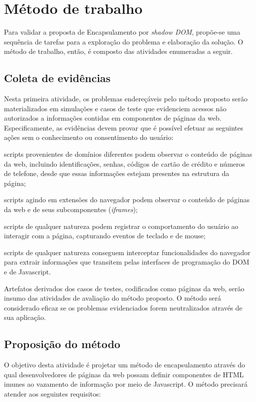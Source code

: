 \section{Método de trabalho}


Para validar a proposta de Encapsulamento por \textit{shadow DOM}, propõe-se uma sequência de tarefas para a exploração do problema e elaboração da solução. O método de trabalho, então, é composto das atividades enumeradas a seguir.


\subsection{Coleta de evidências}
Nesta primeira atividade, os problemas endereçáveis pelo método proposto serão materializados em simulações e casos de teste que evidenciem acessos não autorizados a informações contidas em componentes de páginas da web. Especificamente, as evidências devem provar que é possível efetuar as seguintes ações sem o conhecimento ou consentimento do usuário:

\begin{alineas}
	\item scripts provenientes de domínios diferentes podem observar o conteúdo de páginas da web, incluindo identificações, senhas, códigos de cartão de crédito e números de telefone, desde que essas informações estejam presentes na estrutura da página;
	\item scripts agindo em extensões do navegador podem observar o conteúdo de páginas da web e de seus subcomponentes (\textit{iframes});
	\item scripts de qualquer natureza podem registrar o comportamento do usuário ao interagir com a página, capturando eventos de teclado e de mouse;
	\item scripts de qualquer natureza conseguem interceptar funcionalidades do navegador para extrair informações que transitem pelas interfaces de programação do DOM e de Javascript.
\end{alineas}

Artefatos derivados dos casos de testes, codificados como páginas da web, serão insumo das atividades de avaliação do método proposto. O método será considerado eficaz se os problemas evidenciados forem neutralizados através de sua aplicação.


\subsection{Proposição do método}
O objetivo desta atividade é projetar um método de encapsulamento através do qual desenvolvedores de páginas da web possam definir componentes de HTML imunes ao vazamento de informação por meio de Javascript. O método precisará atender aos seguintes requisitos:

